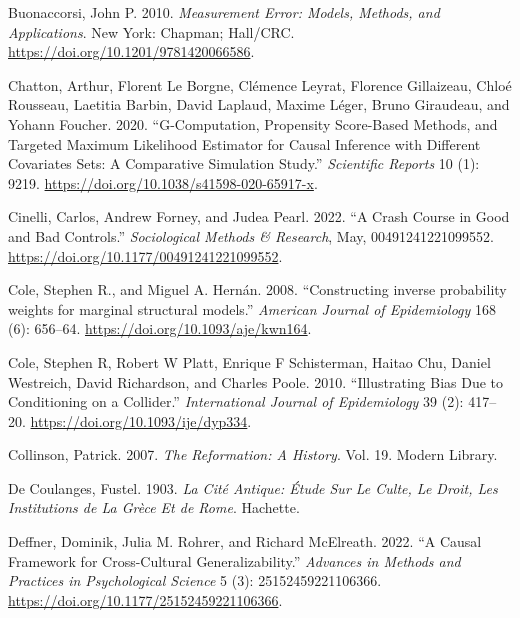 \documentclass[
  singlecolumn]{article}
\newlength{\cslhangindent}
\newlength{\cslentryspacingunit} %
\newenvironment{CSLReferences}[2] %
 {%
  \setlength{\parindent}{0pt}
  \ifodd #1
  \let\oldpar\par
  \def\par{\hangindent=\cslhangindent\oldpar}
  \fi
  \setlength{\parskip}{#2\cslentryspacingunit}
 }%
 {}
\begin{document}
\begin{CSLReferences}{1}{0}
\leavevmode{}%
Buonaccorsi, John P. 2010. \emph{Measurement Error: Models, Methods, and
Applications}. New York: Chapman; Hall/CRC.
\url{https://doi.org/10.1201/9781420066586}.

\leavevmode{}%
Chatton, Arthur, Florent Le Borgne, Clémence Leyrat, Florence
Gillaizeau, Chloé Rousseau, Laetitia Barbin, David Laplaud, Maxime
Léger, Bruno Giraudeau, and Yohann Foucher. 2020. {``G-Computation,
Propensity Score-Based Methods, and Targeted Maximum Likelihood
Estimator for Causal Inference with Different Covariates Sets: A
Comparative Simulation Study.''} \emph{Scientific Reports} 10 (1): 9219.
\url{https://doi.org/10.1038/s41598-020-65917-x}.

\leavevmode{}%
Cinelli, Carlos, Andrew Forney, and Judea Pearl. 2022. {``A Crash Course
in Good and Bad Controls.''} \emph{Sociological Methods \& Research},
May, 00491241221099552. \url{https://doi.org/10.1177/00491241221099552}.

\leavevmode{}%
Cole, Stephen R., and Miguel A. Hernán. 2008. {``Constructing inverse
probability weights for marginal structural models.''} \emph{American
Journal of Epidemiology} 168 (6): 656--64.
\url{https://doi.org/10.1093/aje/kwn164}.

\leavevmode{}%
Cole, Stephen R, Robert W Platt, Enrique F Schisterman, Haitao Chu,
Daniel Westreich, David Richardson, and Charles Poole. 2010.
{``Illustrating Bias Due to Conditioning on a Collider.''}
\emph{International Journal of Epidemiology} 39 (2): 417--20.
\url{https://doi.org/10.1093/ije/dyp334}.

\leavevmode{}%
Collinson, Patrick. 2007. \emph{The Reformation: A History}. Vol. 19.
Modern Library.

\leavevmode{}%
De Coulanges, Fustel. 1903. \emph{La Cité Antique: Étude Sur Le Culte,
Le Droit, Les Institutions de La Grèce Et de Rome}. Hachette.

\leavevmode{}%
Deffner, Dominik, Julia M. Rohrer, and Richard McElreath. 2022. {``A
Causal Framework for Cross-Cultural Generalizability.''} \emph{Advances
in Methods and Practices in Psychological Science} 5 (3):
25152459221106366. \url{https://doi.org/10.1177/25152459221106366}.


\end{CSLReferences}
\end{document}
